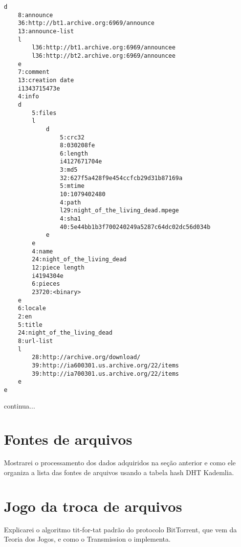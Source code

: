 \begin{verbatim}
d
    8:announce
    36:http://bt1.archive.org:6969/announce
    13:announce-list
    l
        l36:http://bt1.archive.org:6969/announcee
        l36:http://bt2.archive.org:6969/announcee
    e
    7:comment
    13:creation date
    i1343715473e
    4:info
    d
        5:files
        l
            d
                5:crc32
                8:030208fe
                6:length
                i4127671704e
                3:md5
                32:627f5a428f9e454ccfcb29d31b87169a
                5:mtime
                10:1079402480
                4:path
                l29:night_of_the_living_dead.mpege
                4:sha1
                40:5e44bb1b3f700240249a5287c64dc02dc56d034b
            e
        e
        4:name
        24:night_of_the_living_dead
        12:piece length
        i4194304e
        6:pieces
        23720:<binary>
    e
    6:locale
    2:en
    5:title
    24:night_of_the_living_dead
    8:url-list
    l
        28:http://archive.org/download/
        39:http://ia600301.us.archive.org/22/items
        39:http://ia700301.us.archive.org/22/items
    e
e
\end{verbatim}

continua...


\section{Fontes de arquivos}

Mostrarei o processamento dos dados adquiridos na seção anterior e como ele organiza a lista das fontes de arquivos usando a tabela hash DHT Kademlia.

\section{Jogo da troca de arquivos}

Explicarei o algoritmo tit-for-tat padrão do protocolo BitTorrent, que vem da Teoria dos Jogos, e como o Transmission o implementa.

\afterpage{\clearpage}